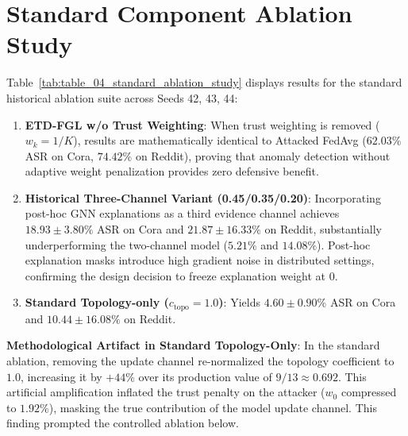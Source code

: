 \section{Standard Component Ablation Study}
\label{sec:standard_ablation}
Table~\ref{tab:table_04_standard_ablation_study} displays results for the standard historical ablation suite across Seeds 42, 43, 44:
\begin{enumerate}
    \item \textbf{ETD-FGL w/o Trust Weighting}: When trust weighting is removed ($w_k = 1/K$), results are mathematically identical to Attacked FedAvg ($62.03\%$ ASR on Cora, $74.42\%$ on Reddit), proving that anomaly detection without adaptive weight penalization provides zero defensive benefit.
    \item \textbf{Historical Three-Channel Variant (0.45/0.35/0.20)}: Incorporating post-hoc GNN explanations as a third evidence channel achieves $18.93 \pm 3.80\%$ ASR on Cora and $21.87 \pm 16.33\%$ on Reddit, substantially underperforming the two-channel model ($5.21\%$ and $14.08\%$). Post-hoc explanation masks introduce high gradient noise in distributed settings, confirming the design decision to freeze explanation weight at $0$.
    \item \textbf{Standard Topology-only ($c_{\text{topo}} = 1.0$)}: Yields $4.60 \pm 0.90\%$ ASR on Cora and $10.44 \pm 16.08\%$ on Reddit.
\end{enumerate}
\textbf{Methodological Artifact in Standard Topology-Only}:
In the standard ablation, removing the update channel re-normalized the topology coefficient to $1.0$, increasing it by $+44\%$ over its production value of $9/13 \approx 0.692$. This artificial amplification inflated the trust penalty on the attacker ($w_0$ compressed to $1.92\%$), masking the true contribution of the model update channel. This finding prompted the controlled ablation below.
